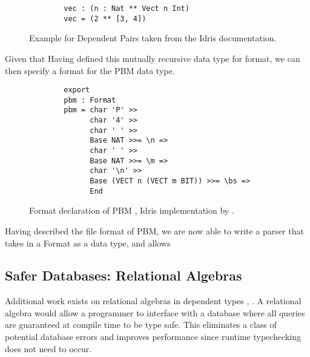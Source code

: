 \begin{figure}
    \caption{Example for Dependent Pairs taken from the Idris documentation.}
    \label{dependentPairExample}
    \begin{lstlisting}
        vec : (n : Nat ** Vect n Int)
        vec = (2 ** [3, 4])
    \end{lstlisting}
\end{figure}

Given that Having defined this mutually recursive data type for format, we can then specify
a format for the PBM data type. 

\begin{figure}
    \caption{Format declaration of PBM \cite{power_of_pi}, Idris implementation by \cite{idris_pop}.}
    \begin{lstlisting}
        export
        pbm : Format
        pbm = char 'P' >>
              char '4' >>
              char ' ' >>
              Base NAT >>= \n =>
              char ' ' >>
              Base NAT >>= \m =>
              char '\n' >>
              Base (VECT n (VECT m BIT)) >>= \bs =>
              End
    \end{lstlisting}
\end{figure}

Having described the file format of PBM, we are now able to write a parser that takes in a Format as a data type, and allows 

\subsection{Safer Databases: Relational Algebras}

Additional work exists on relational algebras in dependent types
\cite{power_of_pi}, \cite{eisenberg2016}. A relational algebra would allow a
programmer to interface with a database where all queries are guaranteed at
compile time to be type safe. This eliminates a class of potential database
errors and improves performance since runtime typechecking does not need to
occur. 



